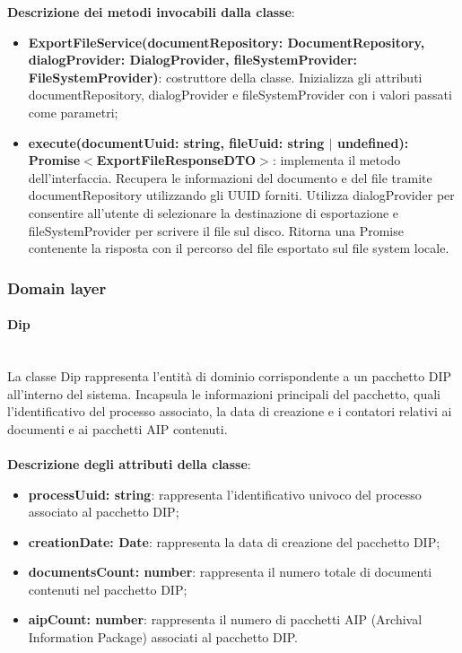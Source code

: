 \documentclass[a4paper,12pt]{article}
\begin{document}
{{              \noindent \textbf{Descrizione dei metodi invocabili dalla classe}:
                \begin{itemize}
                    \item \textbf{ExportFileService(documentRepository: DocumentRepository, dialogProvider: DialogProvider, fileSystemProvider: FileSystemProvider)}: costruttore della classe. Inizializza gli attributi documentRepository, dialogProvider e fileSystemProvider con i valori passati come parametri;
                    \item \textbf{execute(documentUuid: string, fileUuid: string $|$ undefined):\\ Promise$<$ExportFileResponseDTO$>$}: implementa il metodo dell'interfaccia. Recupera le informazioni del documento e del file tramite documentRepository utilizzando gli UUID forniti. Utilizza dialogProvider per consentire all'utente di selezionare la destinazione di esportazione e fileSystemProvider per scrivere il file sul disco. Ritorna una Promise contenente la risposta con il percorso del file esportato sul file system locale.
                \end{itemize}
            }

            \subsubsection{Domain layer}
                \paragraph{Dip}\label{par:Dip}\mbox{}\\
                La classe Dip rappresenta l'entità di dominio corrispondente a un pacchetto DIP all'interno del sistema. Incapsula le informazioni principali del pacchetto, quali l'identificativo del processo associato, la data di creazione e i contatori relativi ai documenti e ai pacchetti AIP contenuti.\\
                \\
                \textbf{Descrizione degli attributi della classe}:
                \begin{itemize}
                    \item \textbf{processUuid: string}: rappresenta l'identificativo univoco del processo associato al pacchetto DIP;
                    \item \textbf{creationDate: Date}: rappresenta la data di creazione del pacchetto DIP;
                    \item \textbf{documentsCount: number}: rappresenta il numero totale di documenti contenuti nel pacchetto DIP;
                    \item \textbf{aipCount: number}: rappresenta il numero di pacchetti AIP (Archival Information Package) associati al pacchetto DIP.
                \end{itemize}

}
\end{document}
